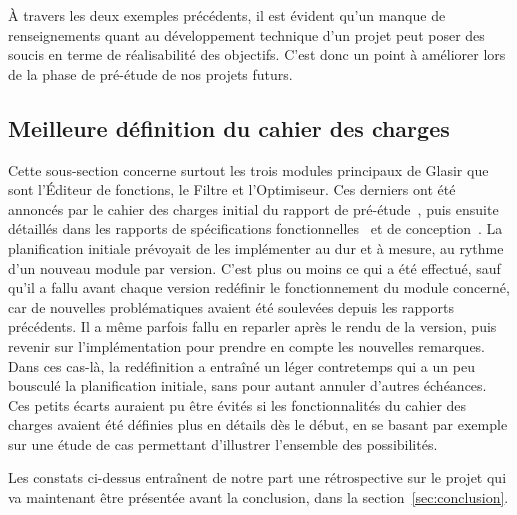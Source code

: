 À travers les deux exemples précédents, il est évident qu'un manque de renseignements quant au développement technique d'un projet peut poser des soucis en terme de réalisabilité des objectifs. C'est donc un point à améliorer lors de la phase de pré-étude de nos projets futurs.

\subsection{Meilleure définition du cahier des charges}
\label{ssec:cahier-charges}

Cette sous-section concerne surtout les trois modules principaux de Glasir que sont l'Éditeur de fonctions, le Filtre et l'Optimiseur. Ces derniers ont été annoncés par le cahier des charges initial du rapport de pré-étude~\cite{pre_etude}, puis ensuite détaillés dans les rapports de spécifications fonctionnelles~\cite{spec_fonc} et de conception~\cite{conception}. La planification initiale prévoyait de les implémenter au dur et à mesure, au rythme d'un nouveau module par version. C'est plus ou moins ce qui a été effectué, sauf qu'il a fallu avant chaque version redéfinir le fonctionnement du module concerné, car de nouvelles problématiques avaient été soulevées depuis les rapports précédents. Il a même parfois fallu en reparler après le rendu de la version, puis revenir sur l'implémentation pour prendre en compte les nouvelles remarques. Dans ces cas-là, la redéfinition a entraîné un léger contretemps qui a un peu bousculé la planification initiale, sans pour autant annuler d'autres échéances. Ces petits écarts auraient pu être évités si les fonctionnalités du cahier des charges avaient été définies plus en détails dès le début, en se basant par exemple sur une étude de cas permettant d'illustrer l'ensemble des possibilités.

Les constats ci-dessus entraînent de notre part une rétrospective sur le projet qui va maintenant être présentée avant la conclusion, dans la {\sc section}~\ref{sec:conclusion}.